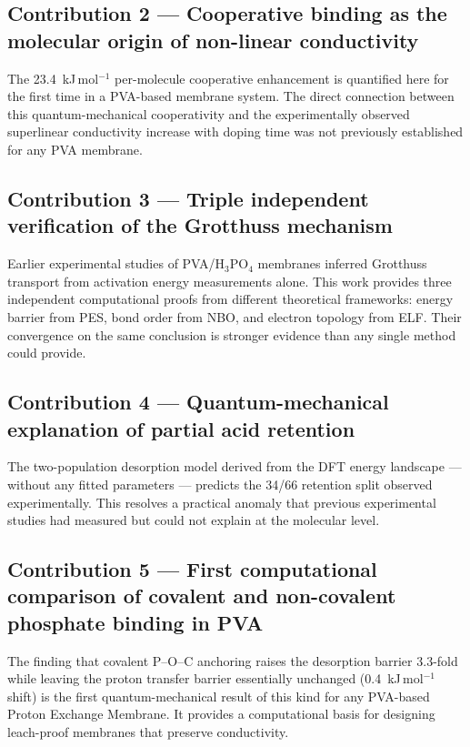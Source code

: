 \documentclass[12pt,a4paper]{report}
\begin{document}
\subsection*{Contribution 2 --- Cooperative binding as 
the molecular origin of non-linear conductivity}

The 23.4~kJ\,mol\(^{-1}\) per-molecule cooperative 
enhancement is quantified here for the first time in a 
PVA-based membrane system. The direct connection between 
this quantum-mechanical cooperativity and the 
experimentally observed superlinear conductivity increase 
with doping time was not previously established for any 
PVA membrane.

\subsection*{Contribution 3 --- Triple independent 
verification of the Grotthuss mechanism}

Earlier experimental studies of PVA/H\(_3\)PO\(_4\) 
membranes inferred Grotthuss transport from activation 
energy measurements alone. This work provides three 
independent computational proofs from different 
theoretical frameworks: energy barrier from PES, bond 
order from NBO, and electron topology from ELF. Their 
convergence on the same conclusion is stronger evidence 
than any single method could provide.

\subsection*{Contribution 4 --- Quantum-mechanical 
explanation of partial acid retention}

The two-population desorption model derived from the DFT 
energy landscape — without any fitted parameters — 
predicts the 34/66 retention split observed experimentally. 
This resolves a practical anomaly that previous experimental 
studies had measured but could not explain at the molecular 
level.

\subsection*{Contribution 5 --- First computational 
comparison of covalent and non-covalent phosphate 
binding in PVA}

The finding that covalent P--O--C anchoring raises the 
desorption barrier 3.3-fold while leaving the proton 
transfer barrier essentially unchanged (0.4~kJ\,mol\(^{-1}\) 
shift) is the first quantum-mechanical result of this kind 
for any PVA-based Proton Exchange Membrane. It provides a 
computational basis for designing leach-proof membranes 
that preserve conductivity.
\end{document}
